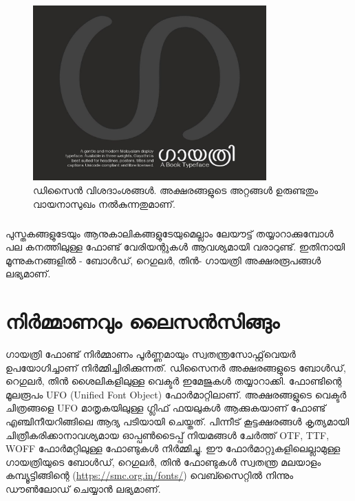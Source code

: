 \documentclass[12pt]{report}
\begin{document}
	\begin{figure}
		\begin{centering}
			\includegraphics[width=0.8\textwidth]{ga.jpg}
			\caption{ഡിസൈന്‍ വിശദാംശങ്ങള്‍. അക്ഷരങ്ങളുടെ അറ്റങ്ങൾ ഉരുണ്ടതും വായനാസുഖം നൽകുന്നതുമാണ്.}
			\label{one}
		\end{centering}
	\end{figure}
	
	\paragraph{}
	പുസ്തകങ്ങളുടേയും ആനുകാലികങ്ങളുടേയുമെല്ലാം ലേയൗട്ട് തയ്യാറാക്കുമ്പോള്‍ പല കനത്തിലുള്ള ഫോണ്ട് വേരിയന്റുകള്‍ ആവശ്യമായി വരാറുണ്ട്. ഇതിനായി മൂന്നുകനങ്ങളില്‍ - ബോള്‍ഡ്, റെഗുലര്‍, തിന്‍- ഗായത്രി അക്ഷരരൂപങ്ങള്‍ ലഭ്യമാണ്. 
	
	\chapter*{നിര്‍മ്മാണവും ലൈസന്‍സിങ്ങും}
	
	ഗായത്രി ഫോണ്ട് നിര്‍മ്മാണം പൂര്‍ണ്ണമായും സ്വതന്ത്രസോഫ്റ്റ്‌വെയർ ഉപയോഗിച്ചാണ് നിർമ്മിച്ചിരിക്കുന്നത്. ഡിസൈനര്‍ അക്ഷരങ്ങളുടെ ബോള്‍ഡ്, റെഗുലര്‍, തിന്‍ ശൈലികളിലുള്ള വെക്ടര്‍ ഇമേജുകള്‍ തയ്യാറാക്കി. ഫോണ്ടിന്റെ മൂലരൂപം UFO (Unified Font Object) ഫോര്‍മാറ്റിലാണ്. അക്ഷരങ്ങളുടെ വെക്ടർ ചിത്രങ്ങളെ UFO മാതൃകയിലുള്ള ഗ്ലിഫ് ഫയലുകള്‍ ആക്കുകയാണ് ഫോണ്ട് എഞ്ചിനീയറിങ്ങിലെ ആദ്യ പടിയായി ചെയ്തത്. പിന്നീട് കൂട്ടക്ഷരങ്ങള്‍ കൃത്യമായി ചിത്രീകരിക്കാനാവശ്യമായ ഓപ്പണ്‍ടൈപ്പ് നിയമങ്ങള്‍ ചേര്‍ത്ത്  OTF, TTF, WOFF ഫോര്‍മറ്റിലുള്ള ഫോണ്ടുകള്‍ നിര്‍മ്മിച്ചു. ഈ ഫോര്‍മാറ്റുകളിലെല്ലാമുള്ള ഗായത്രിയുടെ ബോള്‍ഡ്, റെഗുലര്‍, തിന്‍ ഫോണ്ടുകള്‍ സ്വതന്ത്ര മലയാളം കമ്പ്യൂട്ടിങ്ങിന്റെ (\url{https://smc.org.in/fonts/}) വെബ്സൈറ്റിൽ നിന്നും ഡൗണ്‍ലോഡ് ചെയ്യാന്‍ ലഭ്യമാണ്.
	
\end{document}
